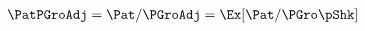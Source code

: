   \begin{align}
    \PatPGroAdj  & = \Pat/\PGroAdj = \Ex[\Pat/\PGro\pShk]  \label{eq:GPF}
  \end{align}
